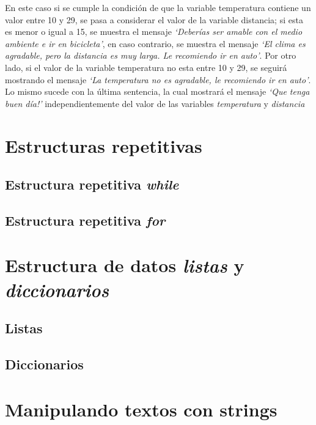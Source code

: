 \documentclass[a4paper,12pt,spanish]{sphinxmanual}
\begin{document}
En este caso si se cumple la condición de que la variable temperatura
contiene un valor entre 10 y 29, se pasa a considerar el valor de la
variable distancia; si esta es menor o igual a 15, se muestra el mensaje
\emph{`Deberías ser amable con el medio ambiente e ir en bicicleta'}, en caso
contrario, se muestra el mensaje \emph{`El clima es agradable, pero la
distancia es muy larga. Le recomiendo ir en auto'}. Por otro lado, si el
valor de la variable temperatura no esta entre 10 y 29, se seguirá
mostrando el mensaje \emph{`La temperatura no es agradable, le recomiendo ir
en auto'}. Lo mismo sucede con la última sentencia, la cual mostrará el
mensaje \emph{`Que tenga buen día!'} independientemente del valor de las
variables \emph{temperatura} y \emph{distancia}


\section{Estructuras repetitivas}
\label{Unidad03:estructuras-repetitivas}

\subsection{Estructura repetitiva \emph{while}}
\label{Unidad03:estructura-repetitiva-while}

\subsection{Estructura repetitiva \emph{for}}
\label{Unidad03:estructura-repetitiva-for}

\section{Estructura de datos \emph{listas} y \emph{diccionarios}}
\label{Unidad03:estructura-de-datos-listas-y-diccionarios}

\subsection{Listas}
\label{Unidad03:listas}

\subsection{Diccionarios}
\label{Unidad03:diccionarios}

\section{Manipulando textos con strings}
\label{Unidad03:manipulando-textos-con-strings}
\end{document}
